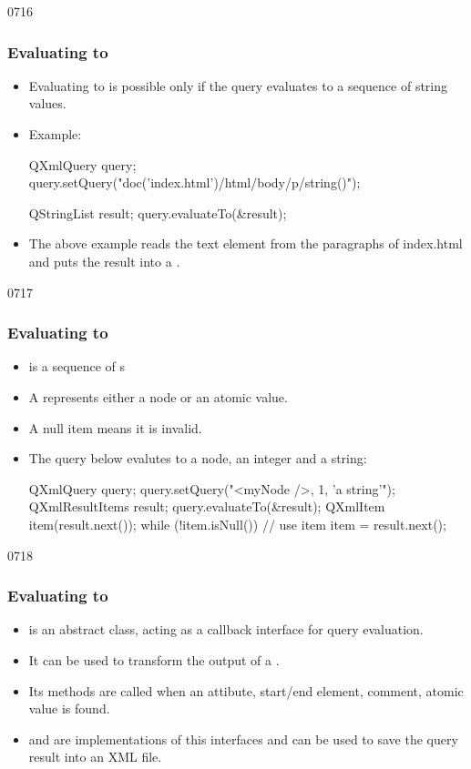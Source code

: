 \begin{slide}[fragile]{0716}
\frametitle{Evaluating to }
\begin{itemize}
\item Evaluating to  is possible only if the query evaluates to a sequence of string values.
\item Example:
\begin{cpp}
QXmlQuery query;
query.setQuery("doc('index.html')/html/body/p/string()");

QStringList result;
query.evaluateTo(&result);
\end{cpp}
\item The above example reads the text element from the paragraphs of index.html and puts the result into a .
\end{itemize}
\end{slide}


\begin{slide}[fragile]{0717}
\frametitle{Evaluating to }
\begin{itemize}
\item {} is a sequence of s
\item A  represents either a node or an atomic value.
\item A null item means it is invalid.
\item The query below evalutes to a node, an integer and a string:
\begin{cpp}
QXmlQuery query;
query.setQuery("<myNode />, 1, 'a string'");
QXmlResultItems result;
query.evaluateTo(&result);
QXmlItem item(result.next());
while (!item.isNull()) {
  // use item
  item = result.next();
}
\end{cpp}
\end{itemize}
\end{slide}


\begin{slide}{0718}
\frametitle{Evaluating to }
\begin{itemize}
\item {} is an abstract class, acting as a callback interface for query evaluation.
\item It can be used to transform the output of a .
\item Its methods are called when an attibute, start/end element, comment, atomic value is found.
\item {} and  are implementations of this interfaces and can be used to save the query result into an XML file.
\end{itemize}
\end{slide}


